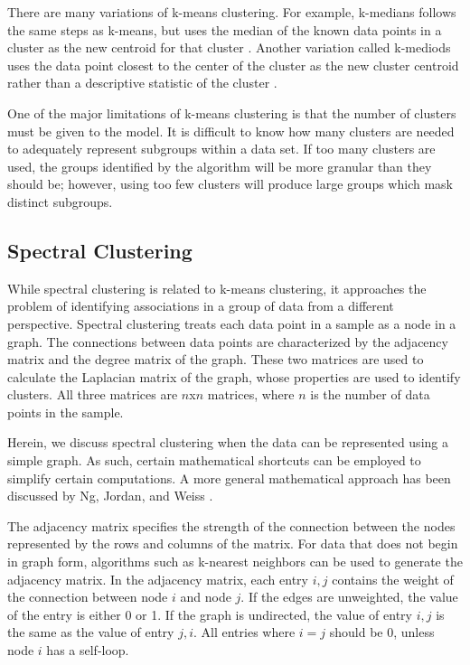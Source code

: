 There are many variations of k-means clustering. For example, k-medians follows the same steps as k-means, but uses the median of the known data points in a cluster as the new centroid for that cluster \cite{Juan1998}. Another variation called k-mediods uses the data point closest to the center of the cluster as the new cluster centroid rather than a descriptive statistic of the cluster \cite{Kaufman1987}.

One of the major limitations of k-means clustering is that the number of clusters must be given to the model. It is difficult to know how many clusters are needed to adequately represent subgroups within a data set. If too many clusters are used, the groups identified by the algorithm will be more granular than they should be; however, using too few clusters will produce large groups which mask distinct subgroups. 



\subsection{Spectral Clustering}

While spectral clustering is related to k-means clustering, it approaches the problem of identifying associations in a group of data from a different perspective. Spectral clustering treats each data point in a sample as a node in a graph. The connections between data points are characterized by the adjacency matrix and the degree matrix of the graph. These two matrices are used to calculate the Laplacian matrix of the graph, whose properties are used to identify clusters. All three matrices are $n$x$n$ matrices, where $n$ is the number of data points in the sample. 

Herein, we discuss spectral clustering when the data can be represented using a simple graph. As such, certain mathematical shortcuts can be employed to simplify certain computations. A more general mathematical approach has been discussed by Ng, Jordan, and Weiss \cite{Ng2002}.

The adjacency matrix specifies the strength of the connection between the nodes represented by the rows and columns of the matrix. For data that does not begin in graph form, algorithms such as k-nearest neighbors can be used to generate the adjacency matrix. In the adjacency matrix, each entry $i, j$ contains the weight of the connection between node $i$ and node $j$. If the edges are unweighted, the value of the entry is either 0 or 1. If the graph is undirected, the value of entry $i, j$ is the same as the value of entry $j, i$. All entries where $i=j$ should be 0, unless node $i$ has a self-loop.

